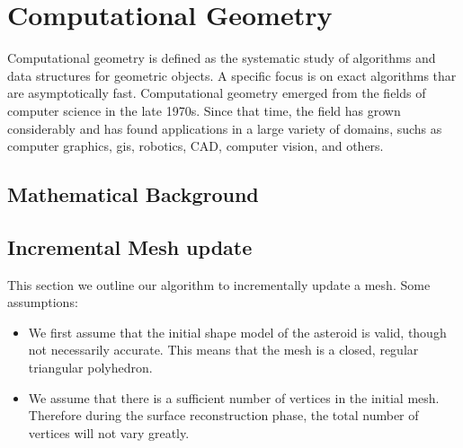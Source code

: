 
\chapter{Computational Geometry}

Computational geometry is defined as the systematic study of algorithms and data structures for geometric objects.
A specific focus is on exact algorithms thar are asymptotically fast.
Computational geometry emerged from the fields of computer science in the late 1970s.
Since that time, the field has grown considerably and has found applications in a large variety of domains, suchs as computer graphics, \gls{gis}, robotics, \gls{CAD}, computer vision, and others.

\section{Mathematical Background}

\section{Incremental Mesh update}

This section we outline our algorithm to incrementally update a mesh. 
Some assumptions:

\begin{itemize}
    \item We first assume that the initial shape model of the asteroid is valid, though not necessarily accurate.
        This means that the mesh is a closed, regular triangular polyhedron.
    \item We assume that there is a sufficient number of vertices in the initial mesh. 
        Therefore during the surface reconstruction phase, the total number of vertices will not vary greatly.
\end{itemize}

